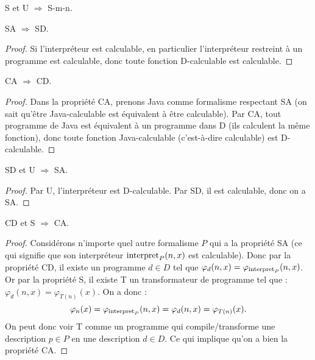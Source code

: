 \begin{myprop}
S et U $\Rightarrow$ S-m-n.
\end{myprop}

\begin{myprop}
SA $\Rightarrow$ SD.
    
\begin{proof}
Si l'interpréteur est calculable, en particulier l'interpréteur restreint à un programme est calculable, donc toute fonction D-calculable est calculable.
\end{proof}
\end{myprop}

\begin{myprop}
CA $\Rightarrow$ CD.
    
\begin{proof}
Dans la propriété CA, prenons Java comme formalisme respectant SA (on sait qu'être Java-calculable est équivalent à être calculable). Par CA, tout programme de Java est équivalent à un programme dans D (ils calculent la même fonction), donc toute fonction Java-calculable (c'est-à-dire calculable) est D-calculable.
\end{proof}
\end{myprop}

\begin{myprop}
SD et U $\Rightarrow$ SA.
    
\begin{proof}
Par U, l'interpréteur est D-calculable. Par SD, il est calculable, donc on a SA.
\end{proof}
\end{myprop}

\begin{myprop}
CD et S $\Rightarrow$ CA.
    
\begin{proof}
Considérons n'importe quel autre formalisme $P$ qui a la propriété SA (ce qui signifie que son interpréteur $\operatorname{interpret}_P(n,x)$ est calculable). Donc par la propriété CD, il existe un programme $d\in D$ tel que $\varphi_d(n,x)=\varphi_{\operatorname{interpret}_P}(n,x)$. Or par la propriété S, il existe T un transformateur de programme tel que : $\varphi_d(n,x)=\varphi_{T(n)}(x)$. On a donc :
$$\varphi_n(x) = \varphi_{\operatorname{interpret}_P}(n,x) = \varphi_d(n,x)=\varphi_{T(n)}(x).$$
On peut donc voir T comme un programme qui compile/transforme une description $p\in P$ en une description $d\in D$. Ce qui implique qu'on a bien la propriété CA.
\end{proof}
\end{myprop}

